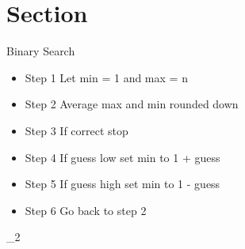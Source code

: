 \documentclass{article}
\begin{document}
\section{Section}
Binary Search
\begin{itemize}
\item Step 1 Let min = 1 and max = n
\item Step 2 Average max and min rounded down
\item Step 3 If correct stop
\item Step 4 If guess low set min to 1 + guess
\item Step 5 If guess high set min to 1 - guess
\item Step 6 Go back to step 2
\end{itemize}

\par

\log_{2}
\end{document}
